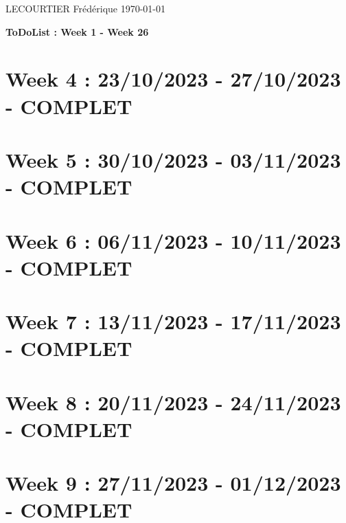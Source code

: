\documentclass{article}
\begin{document}
	LECOURTIER Frédérique \hfill \today
	\begin{center}
		\Large\textbf{{ToDoList : Week 1 - Week 26}}
	\end{center}
	\tableofcontents

	\newpage

	\section*{Week 4 : 23/10/2023 - 27/10/2023 - COMPLET}
	

	\newpage

	\section*{Week 5 : 30/10/2023 - 03/11/2023 - COMPLET}
	

	\newpage

	\section*{Week 6 : 06/11/2023 - 10/11/2023 - COMPLET}
	

	\newpage

	\section*{Week 7 : 13/11/2023 - 17/11/2023 - COMPLET}
	

	\newpage

	\section*{Week 8 : 20/11/2023 - 24/11/2023 - COMPLET}
	

	\newpage

	\section*{Week 9 : 27/11/2023 - 01/12/2023 - COMPLET}
	
\end{document}
